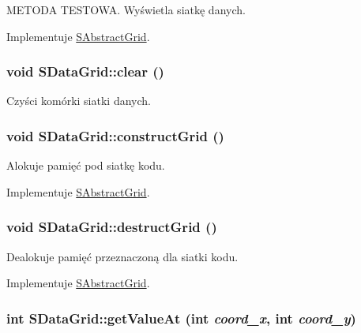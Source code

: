METODA TESTOWA. Wyświetla siatkę danych. 

Implementuje \hyperlink{classSAbstractGrid_e36c03b21a96f33d1ace5fd0b1d218f5}{SAbstractGrid}.\hypertarget{classSDataGrid_80b67d2da29f99384fb2852828d83b91}{
\subsubsection[{clear}]{\setlength{\rightskip}{0pt plus 5cm}void SDataGrid::clear ()}}
\label{classSDataGrid_80b67d2da29f99384fb2852828d83b91}


Czyści komórki siatki danych. \hypertarget{classSDataGrid_5af888335764c1ba959b6ef964223b6d}{
\subsubsection[{constructGrid}]{\setlength{\rightskip}{0pt plus 5cm}void SDataGrid::constructGrid ()}}
\label{classSDataGrid_5af888335764c1ba959b6ef964223b6d}


Alokuje pamięć pod siatkę kodu. 

Implementuje \hyperlink{classSAbstractGrid_919248aad138ffb1c969e73c3e637dcd}{SAbstractGrid}.\hypertarget{classSDataGrid_c9c0ef298fb96c56f9f9796720a41489}{
\subsubsection[{destructGrid}]{\setlength{\rightskip}{0pt plus 5cm}void SDataGrid::destructGrid ()}}
\label{classSDataGrid_c9c0ef298fb96c56f9f9796720a41489}


Dealokuje pamięć przeznaczoną dla siatki kodu. 

Implementuje \hyperlink{classSAbstractGrid_fb63d8cf5210c3606a3b7add19f06833}{SAbstractGrid}.\hypertarget{classSDataGrid_7f9dd63d74e36731875630a96ea8dd07}{
\subsubsection[{getValueAt}]{\setlength{\rightskip}{0pt plus 5cm}int SDataGrid::getValueAt (int {\em coord\_\-x}, \/  int {\em coord\_\-y})}}
\label{classSDataGrid_7f9dd63d74e36731875630a96ea8dd07}


